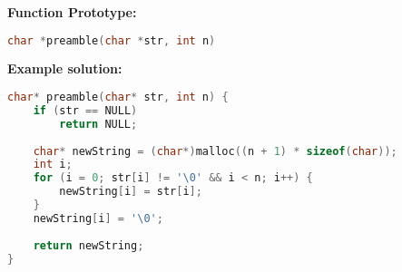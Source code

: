 \documentclass[12pt]{article}
\begin{document}
\textbf{Function Prototype:}
\begin{lstlisting}[language=C]
char *preamble(char *str, int n)
\end{lstlisting}

\textbf{Example solution:}
\begin{lstlisting}[language=C]
char* preamble(char* str, int n) { 
	if (str == NULL)
		return NULL;
		
	char* newString = (char*)malloc((n + 1) * sizeof(char));
	int i;
	for (i = 0; str[i] != '\0' && i < n; i++) {
		newString[i] = str[i]; 
	}
	newString[i] = '\0';
	
	return newString; 
}
\end{lstlisting}
\end{document}
